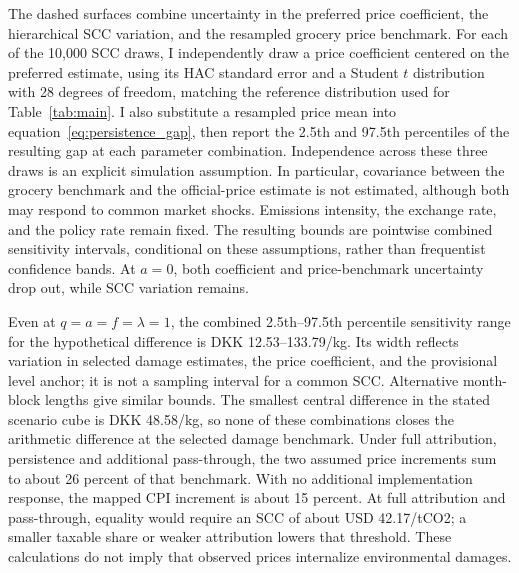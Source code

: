 \documentclass[11pt]{article}
\begin{document}
The dashed surfaces combine uncertainty in the preferred price coefficient, the hierarchical SCC variation, and the resampled grocery price benchmark. For each of the 10,000 SCC draws, I independently draw a price coefficient centered on the preferred estimate, using its HAC standard error and a Student $t$ distribution with 28 degrees of freedom, matching the reference distribution used for Table~\ref{tab:main}. I also substitute a resampled price mean into equation~\eqref{eq:persistence_gap}, then report the 2.5th and 97.5th percentiles of the resulting gap at each parameter combination. Independence across these three draws is an explicit simulation assumption. In particular, covariance between the grocery benchmark and the official-price estimate is not estimated, although both may respond to common market shocks. Emissions intensity, the exchange rate, and the policy rate remain fixed. The resulting bounds are pointwise combined sensitivity intervals, conditional on these assumptions, rather than frequentist confidence bands. At $a=0$, both coefficient and price-benchmark uncertainty drop out, while SCC variation remains.

Even at $q=a=f=\lambda=1$, the combined 2.5th--97.5th percentile sensitivity range for the hypothetical difference is DKK 12.53--133.79/kg. Its width reflects variation in selected damage estimates, the price coefficient, and the provisional level anchor; it is not a sampling interval for a common SCC. Alternative month-block lengths give similar bounds. The smallest central difference in the stated scenario cube is DKK 48.58/kg, so none of these combinations closes the arithmetic difference at the selected damage benchmark. Under full attribution, persistence and additional pass-through, the two assumed price increments sum to about 26 percent of that benchmark. With no additional implementation response, the mapped CPI increment is about 15 percent. At full attribution and pass-through, equality would require an SCC of about USD 42.17/tCO2; a smaller taxable share or weaker attribution lowers that threshold. These calculations do not imply that observed prices internalize environmental damages.
\end{document}
